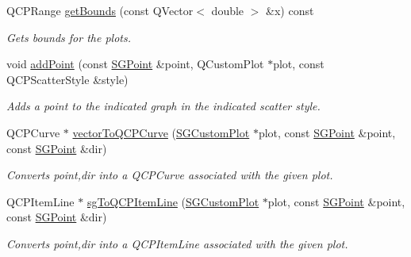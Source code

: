 \begin{DoxyCompactItemize}
Q\+C\+P\+Range \hyperlink{classSGSolutionHandler__V2_a073f114bde7dec5cca4952b25922d009}{get\+Bounds} (const Q\+Vector$<$ double $>$ \&x) const
\begin{DoxyCompactList}\small\item\em Gets bounds for the plots. \end{DoxyCompactList}\item 
\mbox{\label{classSGSolutionHandler__V2_afd8b72f0443e0148fd6157120229ea77}} 
void \hyperlink{classSGSolutionHandler__V2_afd8b72f0443e0148fd6157120229ea77}{add\+Point} (const \hyperlink{classSGPoint}{S\+G\+Point} \&point, Q\+Custom\+Plot $\ast$plot, const Q\+C\+P\+Scatter\+Style \&style)
\begin{DoxyCompactList}\small\item\em Adds a point to the indicated graph in the indicated scatter style. \end{DoxyCompactList}\item 
\mbox{\label{classSGSolutionHandler__V2_a939d07b7c40b82956d27acb63a9b1e58}} 
Q\+C\+P\+Curve $\ast$ \hyperlink{classSGSolutionHandler__V2_a939d07b7c40b82956d27acb63a9b1e58}{vector\+To\+Q\+C\+P\+Curve} (\hyperlink{classSGCustomPlot}{S\+G\+Custom\+Plot} $\ast$plot, const \hyperlink{classSGPoint}{S\+G\+Point} \&point, const \hyperlink{classSGPoint}{S\+G\+Point} \&dir)
\begin{DoxyCompactList}\small\item\em Converts point,dir into a Q\+C\+P\+Curve associated with the given plot. \end{DoxyCompactList}\item 
\mbox{\label{classSGSolutionHandler__V2_ad68296a15677ab396aac4f81476bb6b3}} 
Q\+C\+P\+Item\+Line $\ast$ \hyperlink{classSGSolutionHandler__V2_ad68296a15677ab396aac4f81476bb6b3}{sg\+To\+Q\+C\+P\+Item\+Line} (\hyperlink{classSGCustomPlot}{S\+G\+Custom\+Plot} $\ast$plot, const \hyperlink{classSGPoint}{S\+G\+Point} \&point, const \hyperlink{classSGPoint}{S\+G\+Point} \&dir)
\begin{DoxyCompactList}\small\item\em Converts point,dir into a Q\+C\+P\+Item\+Line associated with the given plot. \end{DoxyCompactList}\end{DoxyCompactItemize}
